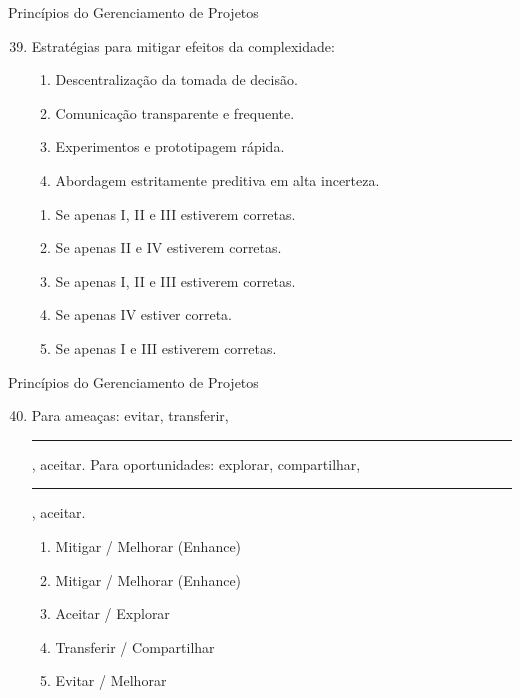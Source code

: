 \documentclass{beamer}
\begin{document}
\begin{frame}{Princípios do Gerenciamento de Projetos}
	\begin{enumerate}
		\setcounter{enumi}{38}
		\justifying
		\item Estratégias para mitigar efeitos da complexidade:
		\begin{enumerate}[I]
			\item Descentralização da tomada de decisão.
			\item Comunicação transparente e frequente.
			\item Experimentos e prototipagem rápida.
			\item Abordagem estritamente preditiva em alta incerteza.
		\end{enumerate}
		\begin{enumerate}[a]
			\item Se apenas I, II e III estiverem corretas.
			\item Se apenas II e IV estiverem corretas.
			\item \alert<2>{Se apenas I, II e III estiverem corretas.}
			\item Se apenas IV estiver correta.
			\item Se apenas I e III estiverem corretas.
		\end{enumerate}
	\end{enumerate}
\end{frame}

\begin{frame}{Princípios do Gerenciamento de Projetos}
	\begin{enumerate}
		\setcounter{enumi}{39}
		\justifying
		\item Para ameaças: evitar, transferir, \rule{50pt}{1pt}, aceitar. Para oportunidades: explorar, compartilhar, \rule{50pt}{1pt}, aceitar.
		\begin{enumerate}[a]
			\item Mitigar / Melhorar (Enhance)
			\item \alert<2>{Mitigar / Melhorar (Enhance)}
			\item Aceitar / Explorar
			\item Transferir / Compartilhar
			\item Evitar / Melhorar
		\end{enumerate}
	\end{enumerate}
\end{frame}
\end{document}
